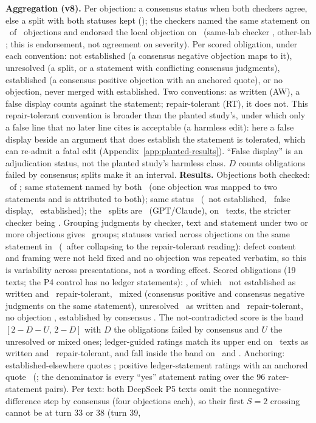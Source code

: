 \textbf{Aggregation (v8).} Per objection: a consensus status when both checkers agree, else a split with both statuses kept (\REFADJSPLITTYPES); the checkers named the same statement on \REFADJSAMESTMT\ of \REFADJN\ objections and endorsed the local objection on \REFADJENDORSE\ (same-lab checker \REFADJENDORSESAME, other-lab \REFADJENDORSEOTHER; this is endorsement, not agreement on severity). Per scored obligation, under each convention: not established (a consensus negative objection maps to it), unresolved (a split, or a statement with conflicting consensus judgments), established (a consensus positive objection with an anchored quote), or no objection, never merged with established. Two conventions: as written (AW), a false display counts against the statement; repair-tolerant (RT), it does not. This repair-tolerant convention is broader than the planted study's, under which only a false line that no later line cites is acceptable (a harmless edit): here a false display beside an argument that does establish the statement is tolerated, which can re-admit a fatal edit (Appendix~\ref{app:planted-results}). ``False display'' is an adjudication status, not the planted study's harmless class. $D$ counts obligations failed by consensus; splits make it an interval. \textbf{Results.} Objections both checked: \REFADJDONE\ of \REFADJN; same statement named by both \REFADJSAMESTMT\ (one objection was mapped to two statements and is attributed to both); same status \REFADJAGREE\ (\REFADJNOTEST\ not established, \REFADJFALSEDISP\ false display, \REFADJEST\ established); the \REFADJSPLIT\ splits are \REFADJSPLITTYPES\ (GPT/Claude), on \REFADJSPLITTEXTS\ texts, the stricter checker being \REFADJSTRICTER. Grouping judgments by checker, text and statement under two or more objections gives \REFADJWORDINGN\ groups; statuses varied across objections on the same statement in \REFADJWORDINGCHANGED\ (\REFADJWORDINGCHANGEDRT\ after collapsing to the repair-tolerant reading): defect content and framing were not held fixed and no objection was repeated verbatim, so this is variability across presentations, not a wording effect. Scored obligations (19 texts; the P4 control has no ledger statements): \REFADJOBLN, of which \REFADJOBLNOTESTAW\ not established as written and \REFADJOBLNOTESTRT\ repair-tolerant, \REFADJOBLMIXED\ mixed (consensus positive and consensus negative judgments on the same statement), unresolved \REFADJOBLUNRESAW\ as written and \REFADJOBLUNRESRT\ repair-tolerant, no objection \REFADJOBLNOOBJ, established by consensus \REFADJOBLEST. The not-contradicted score is the band $[2-D-U,\,2-D]$ with $D$ the obligations failed by consensus and $U$ the unresolved or mixed ones; ledger-guided ratings match its upper end on \REFADJRATEAGREEAW\ texts as written and \REFADJRATEAGREERT\ repair-tolerant, and fall inside the band on \REFADJRATEWITHINAW\ and \REFADJRATEWITHINRT. Anchoring: established-elsewhere quotes \REFADJANCHELSE; positive ledger-statement ratings with an anchored quote \REFADJANCHRATE\ (\REFADJANCHRATER; the denominator is every ``yes'' statement rating over the 96 rater-statement pairs). Per text: both DeepSeek P5 texts omit the nonnegative-difference step by consensus (four objections each), so their first $S{=}2$ crossing cannot be at turn 33 or 38 (turn 39, 